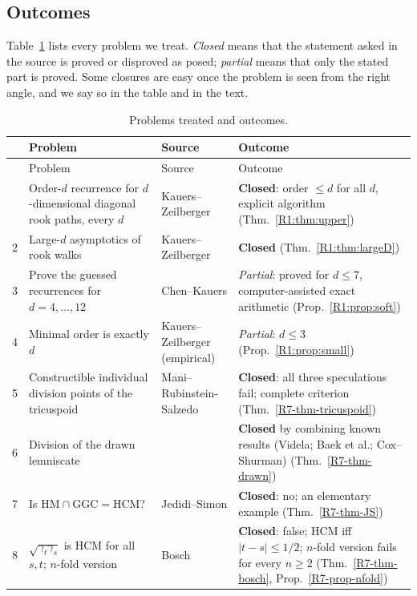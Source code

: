 \documentclass[11pt]{amsart}
\theoremstyle{definition}
\theoremstyle{remark}
\begin{document}
\subsection{Outcomes}
Table~\ref{tab:outcomes} lists every problem we treat. \emph{Closed} means
that the statement asked in the source is proved or disproved as posed;
\emph{partial} means that only the stated part is proved. Some closures are
easy once the problem is seen from the right angle, and we say so in the
table and in the text.

{\small
\begin{longtable}{@{}p{}>{\raggedright\arraybackslash}p{}>{\raggedright\arraybackslash}p{}>{\raggedright\arraybackslash}p{}@{}}
\caption{Problems treated and outcomes.}\label{tab:outcomes}\\
\toprule
 & Problem & Source & Outcome\\
\midrule\endfirsthead
\toprule
 & Problem & Source & Outcome\\
\midrule\endhead
\bottomrule\endfoot
1 & Order-$d$ recurrence for $d$-dimensional diagonal rook paths, every $d$ & Kauers--Zeilberger \cite[\S2]{R1-KZ} & \textbf{Closed}: order $\le d$ for all $d$, explicit algorithm (Thm.~\ref{R1:thm:upper})\\
2 & Large-$d$ asymptotics of rook walks & Kauers--Zeilberger \cite[\S8]{R1-KZ} & \textbf{Closed} (Thm.~\ref{R1:thm:largeD})\\
3 & Prove the guessed recurrences for $d=4,\dots,12$ & Chen--Kauers \cite[Problem~17]{R1-CK} & \emph{Partial}: proved for $d\le7$, computer-assisted exact arithmetic (Prop.~\ref{R1:prop:soft})\\
4 & Minimal order is exactly $d$ & Kauers--Zeilberger (empirical) & \emph{Partial}: $d\le3$ (Prop.~\ref{R1:prop:small})\\
5 & Constructible individual division points of the tricuspoid & Mani--Rubinstein-Salzedo \cite[Rem.~5.7]{R7-MRS16} & \textbf{Closed}: all three speculations fail; complete criterion (Thm.~\ref{R7-thm-tricuspoid})\\
6 & Division of the drawn lemniscate & \cite[Rem.~1.4]{R7-MRS16} & \textbf{Closed} by combining known results (Videla; Baek et al.; Cox--Shurman) (Thm.~\ref{R7-thm-drawn})\\
7 & Is $\mathrm{HM}\cap\mathrm{GGC}=\mathrm{HCM}$? & Jedidi--Simon \cite[Rem.~4.1(b)]{R7-JS13} & \textbf{Closed}: no; an elementary example (Thm.~\ref{R7-thm-JS})\\
8 & $\sqrt{\gamma_t\gamma_s}$ is HCM for all $s,t$; $n$-fold version & Bosch \cite[Rem.~1]{R7-Bosch15} & \textbf{Closed}: false; HCM iff $|t-s|\le1/2$; $n$-fold version fails for every $n\ge2$ (Thm.~\ref{R7-thm-bosch}, Prop.~\ref{R7-prop-nfold})\\

\end{longtable}}
\end{document}
